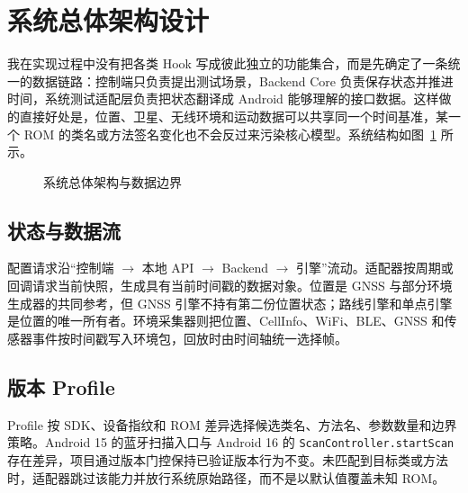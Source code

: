 \section{系统总体架构设计}
我在实现过程中没有把各类 Hook 写成彼此独立的功能集合，而是先确定了一条统一的数据链路：控制端只负责提出测试场景，Backend Core 负责保存状态并推进时间，系统测试适配层负责把状态翻译成 Android 能够理解的接口数据。这样做的直接好处是，位置、卫星、无线环境和运动数据可以共享同一个时间基准，某一个 ROM 的类名或方法签名变化也不会反过来污染核心模型。系统结构如图~\ref{fig:architecture} 所示。

\begin{figure}[htbp]
\centering
{}
\caption{系统总体架构与数据边界}
\label{fig:architecture}
\end{figure}

\subsection{状态与数据流}
配置请求沿“控制端 $\rightarrow$ 本地 API $\rightarrow$ Backend $\rightarrow$ 引擎”流动。适配器按周期或回调请求当前快照，生成具有当前时间戳的数据对象。位置是 GNSS 与部分环境生成器的共同参考，但 GNSS 引擎不持有第二份位置状态；路线引擎和单点引擎是位置的唯一所有者。环境采集器则把位置、CellInfo、WiFi、BLE、GNSS 和传感器事件按时间戳写入环境包，回放时由时间轴统一选择帧。

\subsection{版本 Profile}
Profile 按 SDK、设备指纹和 ROM 差异选择候选类名、方法名、参数数量和边界策略。Android 15 的蓝牙扫描入口与 Android 16 的 \texttt{ScanController.startScan} 存在差异，项目通过版本门控保持已验证版本行为不变。未匹配到目标类或方法时，适配器跳过该能力并放行系统原始路径，而不是以默认值覆盖未知 ROM。